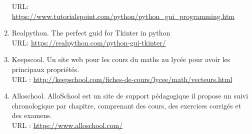 \documentclass[a4paper]{report}
\newcommand{\link}[1]{{\color{blue}\href{#1}{#1}}}
\begin{document}
\begin{enumerate}
    URL: \link{https://www.tutorialspoint.com/python/python_gui_programming.htm}
    \item Realpython. The perfect guid for Tkinter in python\\
    URL: \link{https://realpython.com/python-gui-tkinter/}
    \item Keepscool. Un site web pour les cours du maths au lycée pour avoir les principaux propriétés.\\ 
    URL : \link{http://keepschool.com/fiches-de-cours/lycee/math/vecteurs.html}
    \item Alloschool. AlloSchool est un site de support pédagogique il propose un suivi chronologique par chapitre, comprenant des cours, des exercices corrigés et des examens.\\
    URL : \link{https://www.alloschool.com/}
\end{enumerate}
\end{document}
